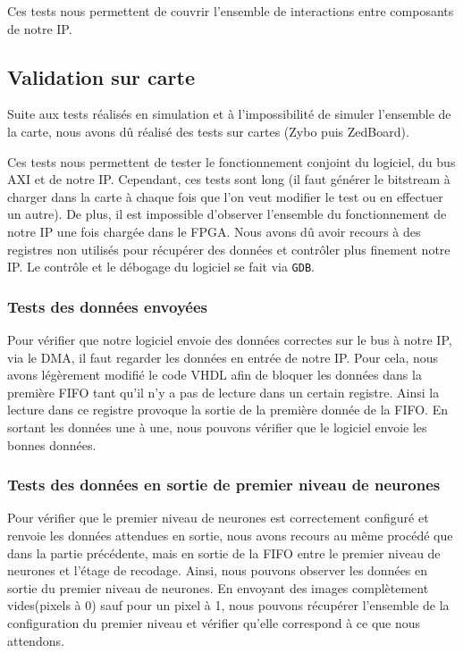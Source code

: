 Ces tests nous permettent de couvrir l'ensemble de interactions entre composants
de notre IP.

\subsection{Validation sur carte}

Suite aux tests réalisés en simulation et à l'impossibilité de simuler
l'ensemble de la carte, nous avons dû réalisé des tests sur cartes (Zybo puis ZedBoard).

Ces tests nous permettent de tester le fonctionnement conjoint du logiciel, du
bus AXI et de notre IP. Cependant, ces tests sont long (il faut générer le
bitstream à charger dans la carte à chaque fois que l'on veut modifier le test ou
en effectuer un autre). De plus, il est impossible d'observer l'ensemble du
fonctionnement de notre IP une fois chargée dans le FPGA. Nous avons dû avoir
recours à des registres non utilisés pour récupérer des données et contrôler
plus finement notre IP. Le contrôle et le débogage du logiciel se fait via \texttt{GDB}.

\subsubsection{Tests des données envoyées}

Pour vérifier que notre logiciel envoie des données correctes sur le bus à notre
IP, via le DMA, il faut regarder les données en entrée de notre IP.
Pour cela, nous avons légèrement modifié le code VHDL afin de bloquer les
données dans la première FIFO tant qu'il n'y a pas de lecture dans
un certain registre. Ainsi la lecture dans ce registre provoque la sortie de
la première donnée de la FIFO. En sortant les données une à une, nous pouvons
vérifier que le logiciel envoie les bonnes données.

\subsubsection{Tests des données en sortie de premier niveau de neurones}

Pour vérifier que le premier niveau de neurones est correctement configuré et
renvoie les données attendues en sortie, nous avons recours au même procédé que
dans la partie précédente, mais en sortie de la FIFO entre le premier niveau
de neurones et l'étage de recodage.
Ainsi, nous pouvons observer les données en sortie du premier niveau de neurones.
En envoyant des images complètement vides(pixels à 0) sauf pour un pixel à 1,
nous pouvons récupérer l'ensemble de la configuration du premier niveau et
vérifier qu'elle correspond à ce que nous attendons.

